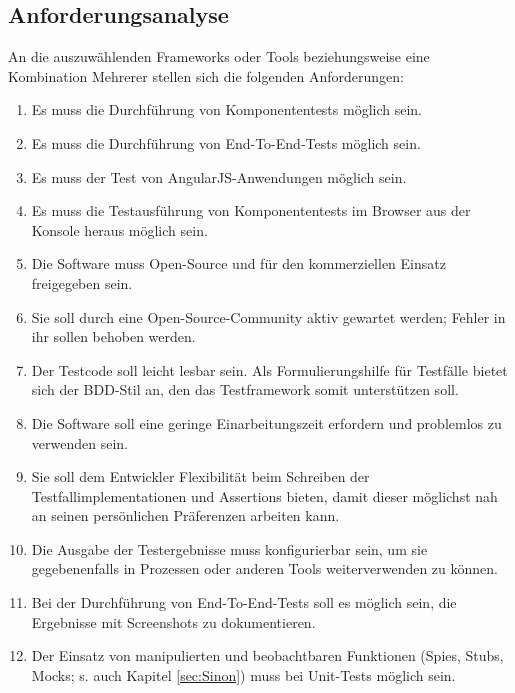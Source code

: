 \subsection{Anforderungsanalyse}
\label{sec:anforderungsanalyse}
An die auszuwählenden Frameworks oder Tools beziehungsweise eine Kombination Mehrerer stellen sich die folgenden Anforderungen:
\begin{enumerate}[label=\textbf{A\arabic*}]
	\item Es muss die Durchführung von Komponententests möglich sein.
	\item Es muss die Durchführung von End-To-End-Tests möglich sein.
	\item Es muss der Test von AngularJS-Anwendungen möglich sein.
	\item Es muss die Testausführung von Komponententests im Browser aus der Konsole heraus möglich sein.
	\item Die Software muss Open-Source und für den kommerziellen Einsatz freigegeben sein.
	\item Sie soll durch eine Open-Source-Community aktiv gewartet werden; Fehler in ihr sollen behoben werden.
	\item Der Testcode soll leicht lesbar sein\cite[][7]{coba-programmierrichtlinienAllgemein}. Als Formulierungshilfe für Testfälle bietet sich der BDD-Stil an, den das Testframework somit unterstützen soll.
	\item Die Software soll eine geringe Einarbeitungszeit erfordern und problemlos zu verwenden sein. 
	\item Sie soll dem Entwickler Flexibilität beim Schreiben der Testfallimplementationen und Assertions bieten, damit dieser möglichst nah an seinen persönlichen Präferenzen arbeiten kann.
	\item Die Ausgabe der Testergebnisse muss konfigurierbar sein, um sie gegebenenfalls in Prozessen oder anderen Tools weiterverwenden zu können.
	\item Bei der Durchführung von End-To-End-Tests soll es möglich sein, die Ergebnisse mit Screenshots zu dokumentieren.
	\item Der Einsatz von manipulierten und beobachtbaren Funktionen (Spies, Stubs, Mocks; s. auch Kapitel \ref{sec:Sinon}) muss bei Unit-Tests möglich sein.
\end{enumerate}

